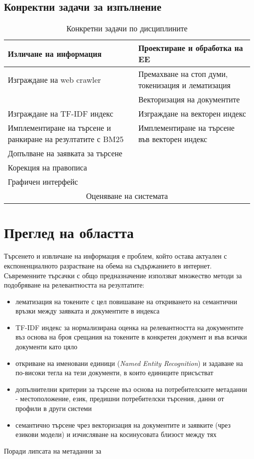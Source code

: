 \documentclass[a4paper,12pt]{article} \usepackage[utf8]{inputenc}
\begin{document}
\subsection{Конректни задачи за изпълнение} \begin{table}[H] \centering
\begin{tabular}{|m{}|>{\color{gray}}m{}|} \hline
\textbf{Изличане на информация} & \textbf{Проектиране и обработка на EE} \\
\hline Изграждане на web crawler & Премахване на стоп думи, токенизация и
лематизация \\ \hline & Векторизация на документите \\ \hline Изграждане на
TF-IDF индекс & Изграждане на векторен индекс \\ \hline Имплементиране на
търсене и ранкиране на резултатите с BM25 & Имплементиране на търсене във
векторен индекс\\ \hline Допълване на заявката за търсене & \\ \hline Корекция
на правописа & \\ \hline Графичен интерфейс & \\ \hline
\multicolumn{2}{|c|}{Оценяване на системата}\\ \hline \end{tabular}
\caption{Конкретни задачи по дисциплините} \end{table} \section{Преглед на
областта} Търсенето и извличане на информация е проблем, който остава актуален с
експоненциалното разрастване на обема на съдържанието в интернет. Съвременните
търсачки с общо предназначение използват множество методи за подобряване на
релевантността на резултатите: \begin{itemize} \item лематизация на токените с
цел повишаване на откриването на семантични връзки между заявката и документите
в индекса \item TF-IDF индекс за нормализирана оценка на релевантността на
документите въз основа на броя срещания на токените в конкретен документ и във
всички документи като цяло \item откриване на именовани единици (\emph{Named
Entity Recognition}) и задаване на по-високи тегла на тези документи, в които
единиците присъстват \item допълнителни критерии за търсене въз основа на
потребителските метаданни - местоположение, език, предишни потребителски
търсения, данни от профили в други системи \item семантично търсене чрез
векторизация на документите и заявките (чрез езикови модели) и изчисляване на
косинусовата близост между тях \end{itemize} Поради липсата на метаданни за
\end{document}
